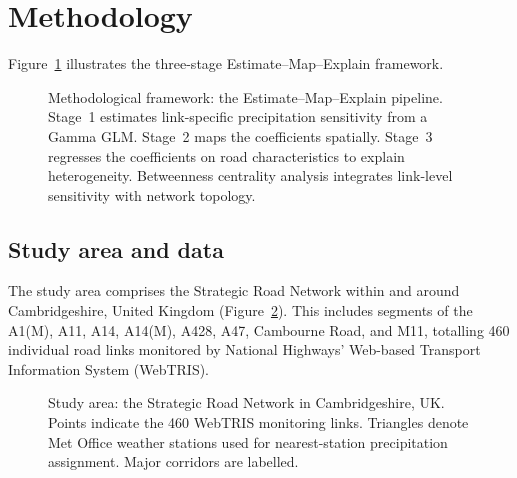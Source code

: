 \documentclass[review]{elsarticle}
\begin{document}
\section{Methodology}
\label{sec:method}

Figure~\ref{fig:framework} illustrates the three-stage Estimate--Map--Explain framework.

\begin{figure}[htbp]
\centering
\caption{Methodological framework: the Estimate--Map--Explain pipeline. Stage~1 estimates link-specific precipitation sensitivity from a Gamma GLM. Stage~2 maps the coefficients spatially. Stage~3 regresses the coefficients on road characteristics to explain heterogeneity. Betweenness centrality analysis integrates link-level sensitivity with network topology.}
\label{fig:framework}
\end{figure}


\subsection{Study area and data}
\label{sec:method:data}

The study area comprises the Strategic Road Network within and around Cambridgeshire, United Kingdom (Figure~\ref{fig:study_area}). This includes segments of the A1(M), A11, A14, A14(M), A428, A47, Cambourne Road, and M11, totalling 460 individual road links monitored by National Highways' Web-based Transport Information System (WebTRIS).

\begin{figure}[htbp]
\centering
\caption{Study area: the Strategic Road Network in Cambridgeshire, UK. Points indicate the 460 WebTRIS monitoring links. Triangles denote Met Office weather stations used for nearest-station precipitation assignment. Major corridors are labelled.}
\label{fig:study_area}
\end{figure}
\end{document}
